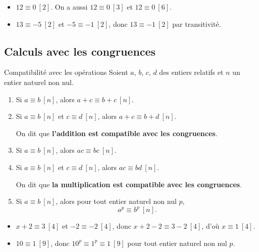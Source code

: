 \begin{exemple}
	\begin{itemize}[label=\textbullet]
		\item $12 \equiv 0\ [2]$. On a aussi $12 \equiv 0\ [3]$ et $12 \equiv 0\ [6]$.
		\item $13 \equiv -5\ [2]$ et $-5 \equiv -1\ [2]$, donc $13 \equiv -1\ [2]$ par transitivité.
	\end{itemize}
\end{exemple}

\subsection{Calculs avec les congruences}

\begin{propriete}{Compatibilité avec les opérations}{}
	Soient $a$, $b$, $c$, $d$ des entiers relatifs et $n$ un entier naturel non nul.

	\begin{enumerate}
		\item Si $a \equiv b\ [n]$, alors $a + c \equiv b + c\ [n]$.

		\item Si $a \equiv b\ [n]$ et $c \equiv d\ [n]$, alors $a + c \equiv b + d\ [n]$.

		On dit que \textbf{l'addition est compatible avec les congruences}.

		\item Si $a \equiv b\ [n]$, alors $ac \equiv bc\ [n]$.

		\item Si $a \equiv b\ [n]$ et $c \equiv d\ [n]$, alors $ac \equiv bd\ [n]$.

		On dit que \textbf{la multiplication est compatible avec les congruences}.

		\item Si $a \equiv b\ [n]$, alors pour tout entier naturel non nul $p$,
		$$
		a^p \equiv b^p\ [n].
		$$
	\end{enumerate}
\end{propriete}

\begin{exemple}
	\begin{itemize}[label=\textbullet]
		\item $x + 2 \equiv 3\ [4]$ et $-2 \equiv -2\ [4]$, donc $x + 2 - 2 \equiv 3 - 2\ [4]$,
		d'où $x \equiv 1\ [4]$.
		\item $10 \equiv 1\ [9]$, donc $10^p \equiv 1^p \equiv 1\ [9]$ pour tout entier naturel non nul $p$.
	\end{itemize}
\end{exemple}

